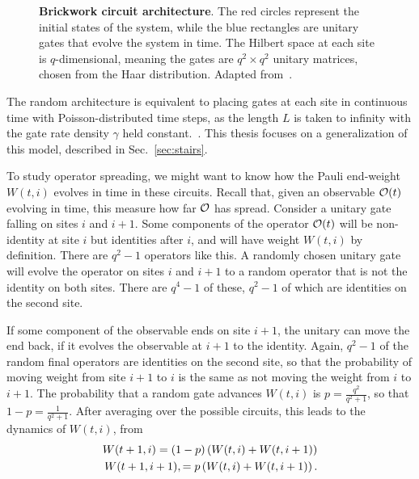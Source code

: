 \begin{figure}
	\centering
	
	\caption{\textbf{Brickwork circuit architecture}. The red circles represent the initial states of the system, while the blue rectangles are unitary gates that evolve the system in time. The Hilbert space at each site is $q$-dimensional, meaning the gates are $q^2\times q^2$ unitary  matrices, chosen from the Haar distribution. Adapted from~\cite{Keyserlingk}.}
	\label{fig:brickcircuit}
\end{figure}

The random architecture is equivalent to placing gates at each site in continuous time with Poisson-distributed time steps, as the length $L$ is taken to infinity with the gate rate density $\gamma$ held constant.~\cite{Nahum2017}. This thesis focuses on a generalization of this model, described in Sec.~\ref{sec:stairs}.


To study operator spreading, we might want to know how the Pauli end-weight $W(t,i)$ evolves in time in these circuits. Recall that, given an observable $\cal{O}(t)$ evolving in time, this measure how far $\cal{O}$ has spread. Consider a unitary gate falling on sites $i$ and $i+1$. Some components of the operator $\cal{O}(t)$ will be non-identity at site $i$ but identities after $i$, and will have weight $W(t, i)$ by definition. There are $q^2-1$ operators like this. A randomly chosen unitary gate will evolve the operator on sites $i$ and $i+1$ to a random operator that is not the identity on both sites. There are $q^4-1$ of these, $q^2-1$ of which are identities on the second site.

If some component of the observable ends on site $i+1$, the unitary can move the end back, if it evolves the observable at $i+1$ to the identity. Again, $q^2-1$ of the random final operators are identities on the second site, so that the probability of moving weight from site $i+1$ to $i$ is the same as not moving the weight from $i$ to $i+1$. The probability that a random gate advances $W(t,i)$ is $p = \frac{q^2}{q^2+1}$, so that $1-p = \frac{1}{q^2+1}$. After averaging over the possible circuits, this leads to the dynamics of $W(t,i)$, from~\cite{Keyserlingk}
\begin{align}
W(t+1, i) = (1-p)\left(W(t, i) + W(t, i+1)\right)\nn
W(t+1, i+1), = p\left(W(t, i) + W(t, i+1)\right). \label{eqn:opsp}
\end{align}

